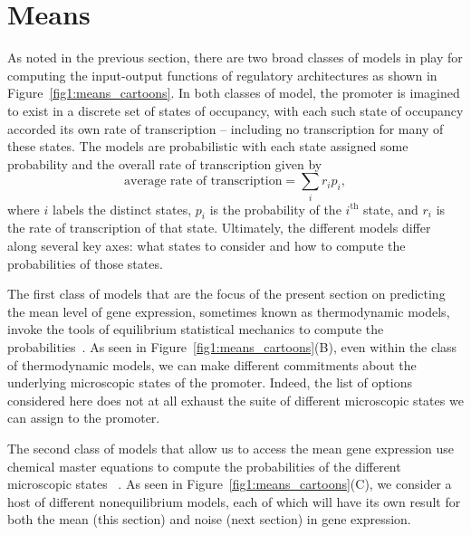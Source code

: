 \section{Means}\label{section_02_means}

As noted in the previous section, there are two broad classes of models in play
for computing the input-output functions of regulatory architectures as shown in
Figure~\ref{fig1:means_cartoons}. In both classes of model, the promoter is
imagined to exist in a discrete set of states of occupancy, with each such state
of occupancy accorded its own rate of transcription -- including no 
transcription for many of these states. The models are probabilistic with each
state assigned some probability and the overall rate of transcription given by 
\begin{equation}
\mbox{average rate of transcription} = \sum_i r_i p_i,
\end{equation}
where $i$ labels the distinct states, $p_i$ is the probability of the
$i^{\text{th}}$ state, and $r_i$ is the rate of transcription of that state.
Ultimately, the different models differ along several key axes: what states to
consider and how to compute the probabilities of those states.

The first class of models that are the focus of the present section on
predicting the mean level of gene expression, sometimes known as thermodynamic
models, invoke the tools of equilibrium statistical mechanics to compute the
probabilities~\cite{Ackers1982, Shea1985, Buchler2003, Vilar2003a, Vilar2003b,
Bintu2005a, Bintu2005c, Gertz2009, Sherman2012, Saiz2013}. As seen in
Figure~\ref{fig1:means_cartoons}(B), even within the class of thermodynamic
models, we can make different commitments about the underlying microscopic
states of the promoter.  Indeed, the list of options considered here does not at
all exhaust the suite of different microscopic states we can assign to the
promoter.

The second class of models that allow us to access the mean gene expression use
chemical master equations to compute the probabilities of the different
microscopic states ~\cite{Ko1991, Peccoud1995, Record1996, Kepler2001,
Sanchez2008, Shahrezaei2008, Sanchez2011, Michel2010}. As seen in
Figure~\ref{fig1:means_cartoons}(C), we consider a host of different
nonequilibrium models, each of which will have its own result for both the mean
(this section) and noise (next section) in gene expression.


